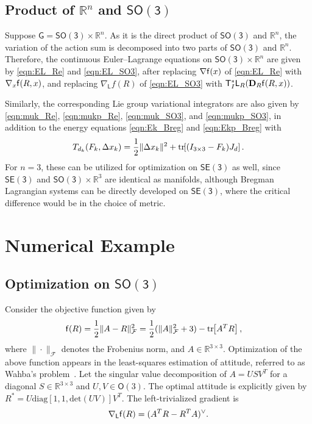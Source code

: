 \documentclass[letterpaper, 10pt, conference]{ieeeconf}
\newcommand{\bracket}[1]{\ensuremath{\left[ #1 \right]}}
\newcommand{\tr}[1]{\mbox{tr}\ensuremath{\negthickspace\bracket{#1}}}
\newcommand{\G}{\ensuremath{\mathsf{G}}}
\newcommand{\SO}{\ensuremath{\mathsf{SO(3)}}}
\newcommand{\T}{\ensuremath{\mathsf{T}}}
\renewcommand{\L}{\ensuremath{\mathsf{L}}}
\newcommand{\SE}{\ensuremath{\mathsf{SE(3)}}}
\renewcommand{\Re}{\ensuremath{\mathbb{R}}}
\newcommand{\D}{\ensuremath{\mathbf{D}}}
\begin{document}
\subsection{Product of $\Re^n$ and $\SO$}

Suppose $\G=\SO\times \Re^n$.
As it is the direct product of $\SO$ and $\Re^n$, the variation of the action sum is decomposed into two parts of $\SO$ and $\Re^n$. 
Therefore, the continuous Euler--Lagrange equations on $\SO\times\Re^n$ are given by \eqref{eqn:EL_Re} and \eqref{eqn:EL_SO3}, after replacing $\nabla \mathsf{f}(x)$ of \eqref{eqn:EL_Re} with $\nabla_x \mathsf{f}(R,x)$, and replacing $\nabla_\L f(R)$ of \eqref{eqn:EL_SO3} with $\T^*_I\L_R(\D_R\obj(R,x))$.

Similarly, the corresponding Lie group variational integrators are also given by \eqref{eqn:muk_Re}, \eqref{eqn:mukp_Re}, \eqref{eqn:muk_SO3}, and \eqref{eqn:mukp_SO3}, in addition to the energy equations \eqref{eqn:Ek_Breg} and \eqref{eqn:Ekp_Breg} with
\begin{align*}
    T_{d_k}(F_k,\Delta x_k) = \frac{1}{2}\|\Delta x_k\|^2 + \tr{(I_{3\times 3}-F_k)J_d}.
\end{align*}
For $n=3$, these can be utilized for optimization on $\SE$ as well, since $\SE$ and $\SO\times \Re^3$ are identical as manifolds, although Bregman Lagrangian systems can be directly developed on $\SE$, where the critical difference would be in the choice of metric.

\section{Numerical Example}

\subsection{Optimization on $\SO$}

\label{sec:experimentA}

Consider the objective function given by
\begin{align}
    \obj (R) & = \frac{1}{2}\| A- R\|^2_{\mathcal{F}}  %
    =\frac{1}{2}(\|A\|^2_{\mathcal{F}} + 3) - \tr{A^T R},\label{eqn:obj_SO3}
\end{align}
where $\|\cdot\|_{\mathcal{F}}$ denotes the Frobenius norm, and $A\in\Re^{3\times 3}$.
Optimization of the above function appears in the least-squares estimation of attitude, referred to as Wahba's problem~\cite{WahSR65}. 
Let the singular value decomposition of $A=USV^T$ for a diagonal $S\in\Re^{3\times 3}$ and $U,V\in\mathsf{O}(3)$.
The optimal attitude is explicitly given by $R^* =  U \mathrm{diag}[1,1,\mathrm{det}(UV)] V^T$.
The left-trivialized gradient is 
\begin{align*}
    \nabla_\L \obj(R)  = (A^T R - R^T A)^\vee.
\end{align*}
\end{document}
